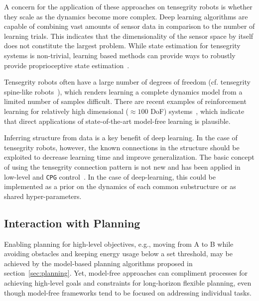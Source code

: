 
A concern for the application of these approaches on tensegrity robots
is whether they scale as the dynamics become more complex.  Deep
learning algorithms are capable of combining vast amounts of sensor
data in comparison to the number of learning trials.  This indicates
that the dimensionality of the sensor space by itself does not
constitute the largest problem.  While state estimation for tensegrity
systems is non-trivial, learning based methods can provide ways to
robustly provide proprioceptive state
estimation~\cite{burms2015online}.

Tensegrity robots often have a large number of degrees of freedom
(cf. tensegrity spine-like robots~\cite{Mirletz2015}), which renders
learning a complete dynamics model from a limited number of samples
difficult.  There are recent examples of reinforcement learning for
relatively high dimensional ($\approx 100$ DoF)
systems~\cite{kumaroptimal}, which indicate that direct applications
of state-of-the-art model-free learning is plausible.  

Inferring structure from data is a key benefit of deep learning.  In
the case of tensegrity robots, however, the known connections in the
structure should be exploited to decrease learning time and improve
generalization.  The basic concept of using the tensegrity connection
pattern is not new and has been applied in low-level and {\tt CPG}
control~\cite{iscen2014flop, MirletzSoftRobotics}.  In the case of
deep-learning, this could be implemented as a prior on the dynamics of
each common substructure or as shared hyper-parameters.



\subsection{Interaction with Planning}

Enabling planning for high-level objectives, e.g., moving from A to B
while avoiding obstacles and keeping energy usage below a set
threshold, may be achieved by the model-based planning algorithms
proposed in section~\ref{sec:planning}.  Yet, model-free approaches
can compliment processes for achieving high-level goals and
constraints for long-horizon flexible planning, even though model-free
frameworks tend to be focused on addressing individual tasks.

